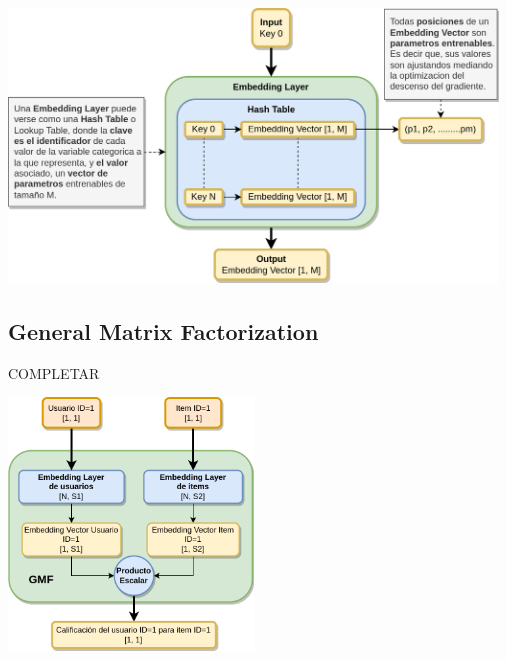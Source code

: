 \documentclass[11pt,a4paper,twoside]{thesis}
\begin{document}
\begin{center}
	\includegraphics[width=13cm]{./images/Embedding-Layer.png}
\end{center}



\subsection{General Matrix Factorization}

COMPLETAR

\begin{center}
	\includegraphics[width=6.5cm]{./images/GMF.png}
\end{center}
\end{document}
